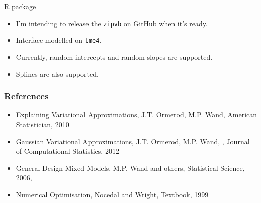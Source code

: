 \documentclass{beamer}
\begin{document}

\begin{frame}{R package}
	\begin{itemize}
		\item I'm intending to release the \texttt{zipvb} on GitHub when it's ready.
		\item Interface modelled on \texttt{lme4}.
		\item Currently, random intercepts and random slopes are supported.
		\item Splines are also supported.
	\end{itemize}	
\end{frame}

\begin{frame}
	\frametitle{References}
	\begin{itemize}
		\item Explaining Variational Approximations, J.T. Ormerod, M.P. Wand, American Statistician, 2010
		\item Gaussian Variational Approximations, J.T. Ormerod, M.P. Wand, , Journal of Computational Statistics, 2012
		\item General Design Mixed Models, M.P. Wand and others, Statistical Science, 2006, 
		\item Numerical Optimisation, Nocedal and Wright, Textbook, 1999
	\end{itemize}
\end{frame}
\end{document}
